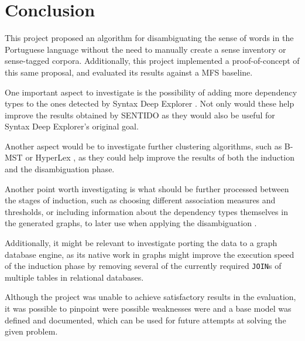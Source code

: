 \chapter{Conclusion}
\label{ch:conclusion}

This project proposed an algorithm for disambiguating the sense of words in the
Portuguese language without the need to manually create a sense inventory or
sense-tagged corpora. Additionally, this project implemented a proof-of-concept
of this same proposal, and evaluated its results against a \ac{MFS} baseline.

One important aspect to investigate is the possibility of adding more
dependency types to the ones detected by Syntax Deep Explorer
\citep{correia2015syntax}. Not only would these help improve the results
obtained
by \ac{SENTIDO} as they would also be useful for Syntax Deep Explorer's original
goal.

Another aspect would be to investigate further clustering algorithms, such as
\ac{B-MST} \citep{marco2013clustering} or HyperLex \citep{veronis2004hyperlex},
as
they could help improve the results of both the induction and the disambiguation
phase.

Another point worth investigating is what should be further processed between
the stages of induction, such as choosing different association measures and
thresholds, or including information about the dependency types themselves in
the generated graphs, to later use when applying the disambiguation
\citep{panchenko2016noun}.

Additionally, it might be relevant to investigate porting the data to a graph
database engine, as its native work in graphs might improve the execution speed
of the induction phase by removing several of the currently required
\texttt{JOIN}s of multiple tables in relational databases.

Although the project was unable to achieve satisfactory results in the
evaluation, it was possible to pinpoint were possible weaknesses were and a base
model was defined and documented, which can be used for future attempts at
solving the given problem.

